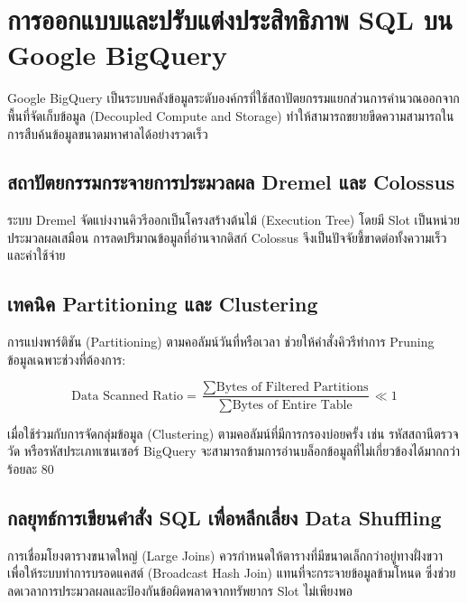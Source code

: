 \chapter{การออกแบบและปรับแต่งประสิทธิภาพ SQL บน Google BigQuery}

Google BigQuery เป็นระบบคลังข้อมูลระดับองค์กรที่ใช้สถาปัตยกรรมแยกส่วนการคำนวณออกจากพื้นที่จัดเก็บข้อมูล (Decoupled Compute and Storage) ทำให้สามารถขยายขีดความสามารถในการสืบค้นข้อมูลขนาดมหาศาลได้อย่างรวดเร็ว

\section{สถาปัตยกรรมกระจายการประมวลผล Dremel และ Colossus}

ระบบ Dremel จัดแบ่งงานคิวรีออกเป็นโครงสร้างต้นไม้ (Execution Tree) โดยมี Slot เป็นหน่วยประมวลผลเสมือน การลดปริมาณข้อมูลที่อ่านจากดิสก์ Colossus จึงเป็นปัจจัยชี้ขาดต่อทั้งความเร็วและค่าใช้จ่าย

\section{เทคนิค Partitioning และ Clustering}

การแบ่งพาร์ติชัน (Partitioning) ตามคอลัมน์วันที่หรือเวลา ช่วยให้คำสั่งคิวรีทำการ Pruning ข้อมูลเฉพาะช่วงที่ต้องการ:

\begin{equation}
\text{Data Scanned Ratio} = \frac{\sum \text{Bytes of Filtered Partitions}}{\sum \text{Bytes of Entire Table}} \ll 1
\end{equation}

เมื่อใช้ร่วมกับการจัดกลุ่มข้อมูล (Clustering) ตามคอลัมน์ที่มีการกรองบ่อยครั้ง เช่น รหัสสถานีตรวจวัด หรือรหัสประเภทเซนเซอร์ BigQuery จะสามารถข้ามการอ่านบล็อกข้อมูลที่ไม่เกี่ยวข้องได้มากกว่าร้อยละ 80

\section{กลยุทธ์การเขียนคำสั่ง SQL เพื่อหลีกเลี่ยง Data Shuffling}

การเชื่อมโยงตารางขนาดใหญ่ (Large Joins) ควรกำหนดให้ตารางที่มีขนาดเล็กกว่าอยู่ทางฝั่งขวา เพื่อให้ระบบทำการบรอดแคสต์ (Broadcast Hash Join) แทนที่จะกระจายข้อมูลข้ามโหนด ซึ่งช่วยลดเวลาการประมวลผลและป้องกันข้อผิดพลาดจากทรัพยากร Slot ไม่เพียงพอ

